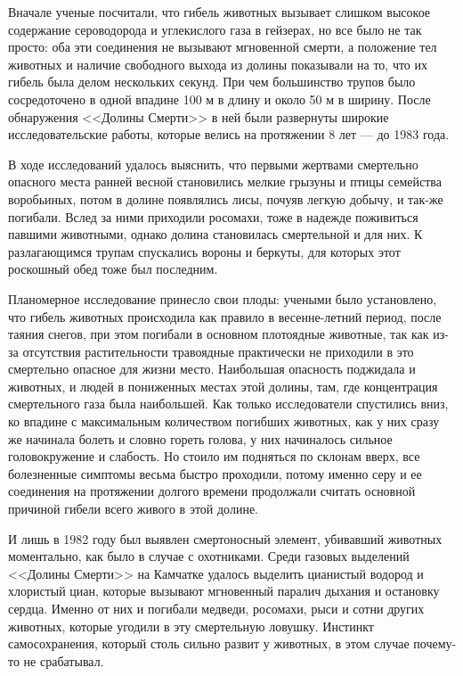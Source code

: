 \documentclass[a4paper, 12pt]{extarticle}
\begin{document}
Вначале ученые посчитали, что гибель животных вызывает слишком высокое содержание сероводорода и углекислого газа в гейзерах, но все было не так просто: оба эти соединения не вызывают мгновенной смерти, а положение тел животных и наличие свободного выхода из долины показывали на то, что их гибель была делом нескольких секунд. При чем большинство трупов было сосредоточено в одной впадине 100 м в длину и около 50 м в ширину. После обнаружения <<Долины Смерти>> в ней были развернуты широкие исследовательские работы, которые велись на протяжении 8 лет — до 1983 года.

В ходе исследований удалось выяснить, что первыми жертвами смертельно опасного места ранней весной становились мелкие грызуны и птицы семейства воробьиных, потом в долине появлялись лисы, почуяв легкую добычу, и так-же погибали. Вслед за ними приходили росомахи, тоже в надежде поживиться павшими животными, однако долина становилась смертельной и для них. К разлагающимся трупам спускались вороны и беркуты, для которых этот роскошный обед тоже был последним.

Планомерное исследование принесло свои плоды: учеными было установлено, что гибель животных происходила как правило в весенне-летний период, после таяния снегов, при этом погибали в основном плотоядные животные, так как из-за отсутствия растительности травоядные практически не приходили в это смертельно опасное для жизни место. Наибольшая опасность поджидала и животных, и людей в пониженных местах этой долины, там, где концентрация смертельного газа была наибольшей. Как только исследователи спустились вниз, ко впадине с максимальным количеством погибших животных, как у них сразу же начинала болеть и словно гореть голова, у них начиналось сильное головокружение и слабость. Но стоило им подняться по склонам вверх, все болезненные симптомы весьма быстро проходили, потому именно серу и ее соединения на протяжении долгого времени продолжали считать основной причиной гибели всего живого в этой долине.

И лишь в 1982 году был выявлен смертоносный элемент, убивавший животных моментально, как было в случае с охотниками. Среди газовых выделений <<Долины Смерти>> на Камчатке удалось выделить цианистый водород и хлористый циан, которые вызывают мгновенный паралич дыхания и остановку сердца. Именно от них и погибали медведи, росомахи, рыси и сотни других животных, которые угодили в эту смертельную ловушку. Инстинкт самосохранения, который столь сильно развит у животных, в этом случае почему-то не срабатывал.
\end{document}
